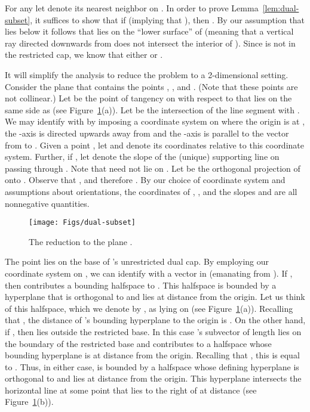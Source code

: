 \documentclass[11pt]{article}   \usepackage[letterpaper,hmargin=2.1cm,vmargin=3cm]{geometry}
\begin{document}
For any  let  denote its nearest neighbor on . In order to prove Lemma~\ref{lem:dual-subset}, it suffices to show that if  (implying that ), then . By our assumption that  lies below  it follows that  lies on the ``lower surface'' of  (meaning that a vertical ray directed downwards from  does not intersect the interior of ). Since  is not in the restricted cap, we know that either  or .

It will simplify the analysis to reduce the problem to a 2-dimensional setting. Consider the plane  that contains the points , , and . (Note that these points are not collinear.) Let  be the point of tangency on  with respect to  that lies on the same side as  (see Figure~\ref{fig:dual-subset}(a)). Let  be the intersection of the line segment  with . We may identify  with  by imposing a coordinate system on  where the origin is at , the -axis is directed upwards away from  and the -axis is parallel to the vector from  to . Given a point , let  and  denote its coordinates relative to this coordinate system. Further, if , let  denote the slope of the (unique) supporting line on  passing through . Note that  need not lie on . Let  be the orthogonal projection of  onto . Observe that , and therefore . By our choice of coordinate system and assumptions about orientations, the coordinates of , , and the slopes  and  are all nonnegative quantities. 

\begin{figure}[htbp]
  \centerline{\texttt{[image: Figs/dual-subset]}}
  \caption{The reduction to the plane .}
  \label{fig:dual-subset}
\end{figure}


The point  lies on the base  of 's unrestricted dual cap. By employing our coordinate system on , we can identify  with a vector in  (emanating from ). If , then  contributes a bounding halfspace to . This halfspace is bounded by a hyperplane that is orthogonal to  and lies at distance  from the origin. Let us think of this halfspace, which we denote by , as lying on  (see Figure~\ref{fig:dual-subset}(a)). Recalling that , the distance of 's bounding hyperplane to the origin  is . On the other hand, if , then  lies outside the restricted base. In this case 's subvector of length  lies on the boundary of the restricted base and contributes to  a halfspace whose bounding hyperplane is at distance  from the origin. Recalling that , this is equal to . Thus, in either case,  is bounded by a halfspace whose defining hyperplane is orthogonal to  and lies at distance  from the origin. This hyperplane intersects the horizontal line  at some point  that lies to the right of  at distance  (see Figure~\ref{fig:dual-subset}(b)). 
\end{document}
